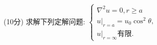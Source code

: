 \documentclass{njustexam}
\begin{document}







\begin{problem}{(10分)}
  求解下列定解问题: 
  $\left\{\begin{array}{l}
    \nabla^2 u=0,  r \geq a \\ 
    \left. u\right|_{r=a}=u_0 \cos^2 \theta,  \\
    \left. u\right|_{r=\infty } \text{有限}. 
  \end{array}\right. $
\end{problem} 
\vfill
\end{document}
